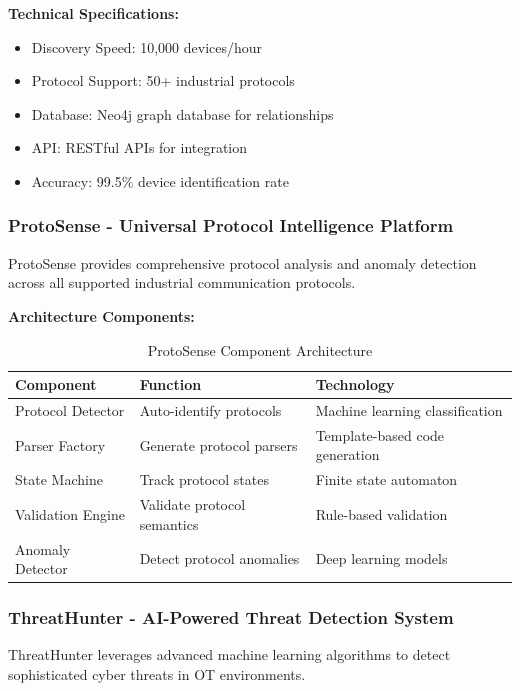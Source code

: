 \documentclass[12pt,a4paper]{article}
\begin{document}
\textbf{Technical Specifications:}
\begin{itemize}
    \item Discovery Speed: 10,000 devices/hour
    \item Protocol Support: 50+ industrial protocols
    \item Database: Neo4j graph database for relationships
    \item API: RESTful APIs for integration
    \item Accuracy: 99.5\% device identification rate
\end{itemize}

\subsubsection{ProtoSense - Universal Protocol Intelligence Platform}

ProtoSense provides comprehensive protocol analysis and anomaly detection across all supported industrial communication protocols.

\textbf{Architecture Components:}
\begin{table}[H]
\centering
\begin{tabular}{|p{3cm}|p{5cm}|p{6cm}|}
\hline
\rowcolor{lightblue}
\textbf{Component} & \textbf{Function} & \textbf{Technology} \\
\hline
Protocol Detector & Auto-identify protocols & Machine learning classification \\
\hline
Parser Factory & Generate protocol parsers & Template-based code generation \\
\hline
State Machine & Track protocol states & Finite state automaton \\
\hline
Validation Engine & Validate protocol semantics & Rule-based validation \\
\hline
Anomaly Detector & Detect protocol anomalies & Deep learning models \\
\hline
\end{tabular}
\caption{ProtoSense Component Architecture}
\end{table}

\subsubsection{ThreatHunter - AI-Powered Threat Detection System}

ThreatHunter leverages advanced machine learning algorithms to detect sophisticated cyber threats in OT environments.
\end{document}
